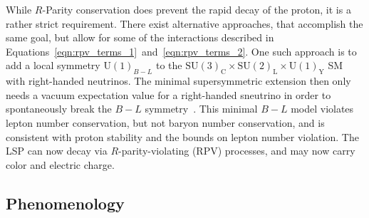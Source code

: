 While $R$-Parity conservation does prevent the rapid decay of the proton, it is
a rather strict requirement.
There exist alternative approaches, that accomplish the same goal, but allow
for some of the interactions described in
Equations~\ref{eqn:rpv_terms_1}~and~\ref{eqn:rpv_terms_2}.
One such approach is to add a local symmetry $\mathrm{U}(1)_{B-L}$ to the
$\mathrm{SU}(3)_\mathrm{C} \times
\mathrm{SU}(2)_\mathrm{L} \times
\mathrm{U}(1)_\mathrm{Y}$ SM with right-handed neutrinos.
The minimal supersymmetric extension then only needs a vacuum expectation value
for a right-handed sneutrino in order to spontaneously break the
$B-L$ symmetry~\cite{FileviezPerez:2008sx, Barger:2008wn, FileviezPerez:2009gr,
Everett:2009vy, Evans:1986ada, Lukas:1998yy, Braun:2005ux, Braun:2005nv,
Braun:2006ae, Ambroso:2009jd, Ambroso:2010pe, Ovrut:2012wg}.
This minimal $B-L$ model violates lepton number conservation, but not baryon
number conservation, and is consistent with proton stability and the bounds on
lepton number violation.
The LSP can now decay via $R$-parity-violating (RPV) processes, and may now
carry color and electric charge.

\subsection{Phenomenology}

\begin{figure}[t]
\end{figure}


